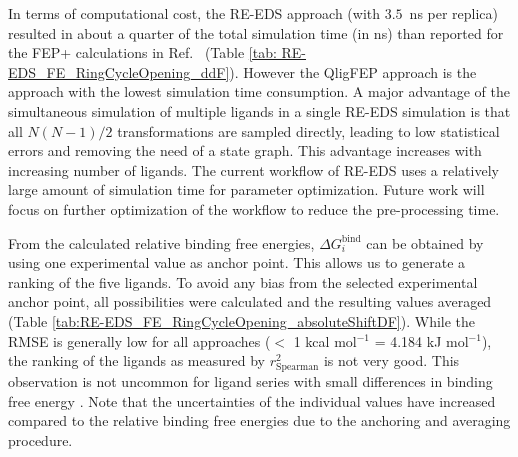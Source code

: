 


In terms of computational cost, the RE-EDS approach (with $3.5$~ns per replica) resulted in about a quarter of the total simulation time (in ns) than reported for the FEP+ calculations in Ref.~\cite{Wang2017} (Table \ref{tab: RE-EDS_FE_RingCycleOpening_ddF}). However the QligFEP approach is the approach with the lowest simulation time consumption. A major advantage of the simultaneous simulation of multiple ligands in a single RE-EDS simulation is that all $N(N-1)/2$ transformations are sampled directly, leading to low statistical errors and removing the need of a state graph. This advantage increases with increasing number of ligands. The current workflow of RE-EDS uses a relatively large amount of simulation time for parameter optimization. Future work will focus on further optimization of the workflow to reduce the pre-processing time. 

From the calculated relative binding free energies, $\Delta G_{i}^{\text{bind}}$ can be obtained by using one experimental value as anchor point. This allows us to generate a ranking of the five ligands. To avoid any bias from the selected experimental anchor point, all possibilities were calculated and the resulting values averaged (Table \ref{tab:RE-EDS_FE_RingCycleOpening_absoluteShiftDF}). While the RMSE is generally low for all approaches ($<$ 1 kcal mol$^{-1}$ = 4.184 kJ mol$^{-1}$), the ranking of the ligands as measured by $r^2_{\text{Spearman}}$ is not very good. 
This observation is not uncommon for ligand series with small differences in binding free energy \cite{wang2015,schindler2020}.
Note that the uncertainties of the individual values have increased compared to the relative binding free energies due to the anchoring and averaging procedure.

